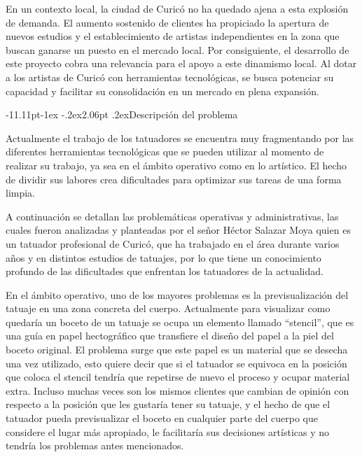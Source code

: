 \documentclass[12pt,letterpaper,oneside]{report}
\makeatletter
\renewcommand\subsection{\@startsection{subsection}{2}{\z@}%
  {-11.11pt\@plus -1ex \@minus -.2ex}{2.06pt \@plus .2ex}{\normalfont\normalsize\bfseries}}
\makeatother
\begin{document}
En un contexto local, la ciudad de Curicó no ha quedado ajena a esta explosión de demanda. El aumento sostenido de clientes ha propiciado la apertura de nuevos estudios y el establecimiento de artistas independientes en la zona que buscan ganarse un puesto en el mercado local. Por consiguiente, el desarrollo de este proyecto cobra una relevancia para el apoyo a este dinamismo local. Al dotar a los artistas de Curicó con herramientas tecnológicas, se busca potenciar su capacidad y facilitar su consolidación en un mercado en plena expansión.

\subsection{Descripción del problema}

Actualmente el trabajo de los tatuadores se encuentra muy fragmentando por las diferentes herramientas tecnológicas que se pueden utilizar al momento de realizar su trabajo, ya sea en el ámbito operativo como en lo artístico. El hecho de dividir sus labores crea dificultades para optimizar sus tareas de una forma limpia.

A continuación se detallan las problemáticas operativas y administrativas, las cuales fueron analizadas y planteadas por el señor Héctor Salazar Moya quien es un tatuador profesional de Curicó, que ha trabajado en el área durante varios años y en distintos estudios de tatuajes, por lo que tiene un conocimiento profundo de las dificultades que enfrentan los tatuadores de la actualidad.

En el ámbito operativo, uno de los mayores problemas es la previsualización del tatuaje en una zona concreta del cuerpo. Actualmente para visualizar como quedaría un boceto de un tatuaje se ocupa un elemento llamado ``stencil'', que es una guía en papel hectográfico que transfiere el diseño del papel a la piel del boceto original. El problema surge que este papel es un material que se desecha una vez utilizado, esto quiere decir que si el tatuador se equivoca en la posición que coloca el stencil tendría que repetirse de nuevo el proceso y ocupar material extra. Incluso muchas veces son los mismos clientes que cambian de opinión con respecto a la posición que les gustaría tener su tatuaje, y el hecho de que el tatuador pueda previsualizar el boceto en cualquier parte del cuerpo que considere el lugar más apropiado, le facilitaría sus decisiones artísticas y no tendría los problemas antes mencionados.
\end{document}
